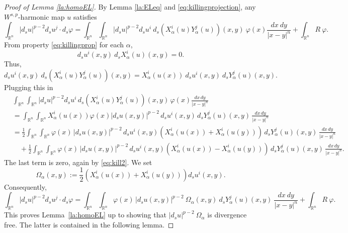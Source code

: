 \documentclass[12pt]{amsart}
\theoremstyle{definition}
\newcommand{\R}{\mathbb{R}}
\newcommand{\brac}[1]{\left (#1 \right )}
\numberwithin{theorem}{section} \numberwithin{equation}{section}
\begin{document}
\begin{proof}[Proof of Lemma \ref{la:homoEL}]
% 
By Lemma \ref{la:ELeq} and \eqref{eq:killingprojection}, any $W^{s,p}$-harmonic map $u$ satisfies
% 
\[
\int_{\R^n} |d_su|^{p-2}d_su^j\cdot d_s \varphi = \int_{\R^n} \int_{\R^n} |d_su|^{p-2}d_su^i \ d_s \brac{X_\alpha^i(u)Y_\alpha^j(u)}(x,y)\ \varphi(x) \frac{dx\ dy}{|x-y|^n}
+ \int_{\R^n} R\ \varphi.
\]
% 
From property \eqref{eq:killingprop} for each $\alpha$,
\begin{equation}\label{eq:kill1}
 d_s u^i(x,y)\ d_s X_\alpha^i(u)(x,y) = 0.
\end{equation}
Thus,
\begin{equation}\label{eq:kill2}
  d_s u^i(x,y) \ d_s \brac{X_\alpha^i(u)Y_\alpha^j(u)}(x,y) = X_\alpha^i(u(x)) \ d_s u^i(x,y) \ d_sY_\alpha^j(u)(x,y).
\end{equation}
%  
Plugging this in
% 
\[
 \begin{split}
  &\int_{\R^n} \int_{\R^n} |d_su|^{p-2}d_su^i \, d_s \brac{X_\alpha^i(u)Y_\alpha^j(u)}(x,y)\, \varphi(x) \frac{dx\, dy}{|x-y|^n}\\
  &=  \int_{\R^n} \int_{\R^n}X_\alpha^i(u(x))\varphi(x) |d_s u(x,y)|^{p-2} \, d_s u^i(x,y)\, d_sY_\alpha^j(u)(x,y)\, \frac{dx\, dy}{|x-y|^n}\\
  &= \frac{1}{2}\int_{\R^n} \int_{\R^n}\varphi(x)\, |d_s u(x,y)|^{p-2} \, d_s u^i(x,y)\brac{X_\alpha^i(u(x)) + X_\alpha^i(u(y))}\, d_sY_\alpha^j(u)(x,y)\, \frac{dx\, dy}{|x-y|^n}\\
  &\quad + \frac{1}{2}\int_{\R^n} \int_{\R^n} \varphi(x)\, |d_s u(x,y)|^{p-2} \, d_s u^i(x,y)\brac{X_\alpha^i(u(x)) - X_\alpha^i(u(y))}\, d_sY_\alpha^j(u)(x,y)\, \frac{dx\, dy}{|x-y|^n}.
\end{split}
\]
The last term is zero, again by \eqref{eq:kill2}. We set
\begin{equation}\label{eq:defomega}
 \Omega_\alpha (x,y) := \frac{1}{2} \brac{X_\alpha^i(u(x)) + X_\alpha^i(u(y))} d_s u^i (x,y).
\end{equation}
Consequently,
\[
\int_{\R^n} |d_su|^{p-2}d_su^j\cdot d_s \varphi = \int_{\R^n} \int_{\R^n}\varphi(x)\, |d_s u(x,y)|^{p-2} \ \Omega_\alpha (x,y)\ d_sY_\alpha^j(u)(x,y)\ \frac{dx\ dy}{|x-y|^n}
+ \int_{\R^n} R\ \varphi.
\]
This proves Lemma~\ref{la:homoEL} up to showing that $|d_s u|^{p-2} \ \Omega_\alpha$ is divergence free. The latter is contained in the following lemma.
\end{proof}
\end{document}
